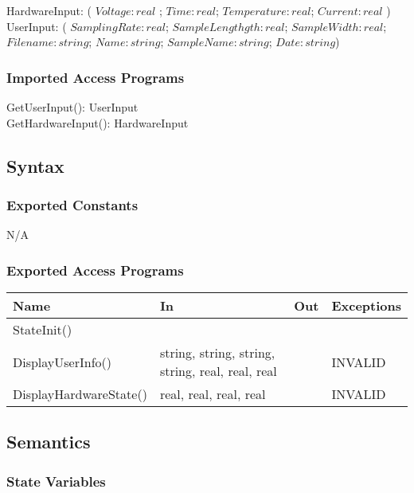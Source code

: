 \documentclass[12pt, titlepage]{article}
\begin{document}
HardwareInput: ( $Voltage: real $ ; $Time: real$; $Temperature: real$; $Current: real$ )\\
UserInput: ( $SamplingRate: real$; $SampleLengthgth: real$; $SampleWidth: real$; $Filename: string$; $Name: string$; $SampleName: string$; $Date: string$)

\subsubsection{Imported Access Programs}

GetUserInput(): UserInput\\
GetHardwareInput(): HardwareInput\\ 


\subsection{Syntax}

\subsubsection{Exported Constants}

N/A
\subsubsection{Exported Access Programs}

\begin{center}
\begin{tabular}{p{5cm} p{5cm} p{1cm} p{3cm}}
\hline
\textbf{Name} & \textbf{In} & \textbf{Out} & \textbf{Exceptions} \\
\hline
StateInit() & &  &  \\
DisplayUserInfo() & string, string, string, string, real, real, real &  & INVALID \\
DisplayHardwareState() & real, real, real, real&  & INVALID \\
\hline
\end{tabular}
\end{center}

\subsection{Semantics}

\subsubsection{State Variables}
\end{document}
